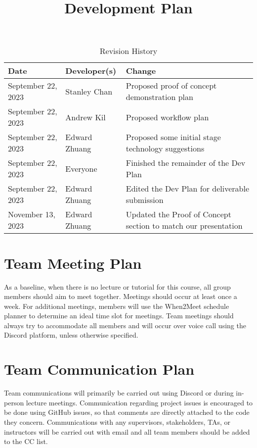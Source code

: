 \documentclass{article}
\title{Development Plan\\\progname}
\author{\authname}
\date{}
\begin{document}
\maketitle

\begin{table}[hp]
\caption{Revision History} \label{TblRevisionHistory}
\begin{tabularx}{\textwidth}{llX}
\toprule
\textbf{Date} & \textbf{Developer(s)} & \textbf{Change}\\
\midrule
September 22, 2023 & Stanley Chan & Proposed proof of concept demonstration plan\\
September 22, 2023 & Andrew Kil & Proposed workflow plan\\
September 22, 2023 & Edward Zhuang & Proposed some initial stage technology suggestions\\
September 22, 2023 & Everyone & Finished the remainder of the Dev Plan\\
September 22, 2023 & Edward Zhuang & Edited the Dev Plan for deliverable submission\\
November 13, 2023 & Edward Zhuang & Updated the Proof of Concept section to match our presentation\\
\bottomrule
\end{tabularx}
\end{table}


\section{Team Meeting Plan}

As a baseline, when there is no lecture or tutorial for this course, all group members should aim to meet together. Meetings should occur at least once a week. For additional meetings, members will use the When2Meet schedule planner to determine an ideal time slot for meetings. Team meetings should always try to accommodate all members and will occur over voice call using the Discord platform, unless otherwise specified.

\section{Team Communication Plan}

Team communications will primarily be carried out using Discord or during in-person lecture meetings. Communication regarding project issues is encouraged to be done using GitHub issues, so that comments are directly attached to the code they concern. Communications with any supervisors, stakeholders, TAs, or instructors will be carried out with email and all team members should be added to the CC list.
\end{document}
